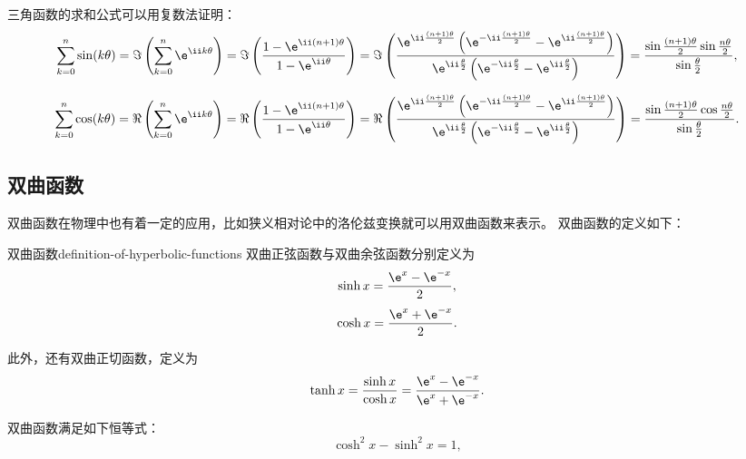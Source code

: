 三角函数的求和公式可以用复数法证明：
\begin{equation}
    \sum_{k=0}^{n} \sin (k \theta)
    = \Im \left( \sum_{k=0}^{n} \e^{\ii k \theta} \right) = \Im \left( \frac{1 - \e^{\ii (n+1) \theta}}{1 - \e^{\ii \theta}} \right)
    = \Im \left( \frac{\e^{\ii \frac{(n+1) \theta}{2}} \left( \e^{-\ii \frac{(n+1) \theta}{2}} - \e^{\ii \frac{(n+1) \theta}{2}} \right)}{\e^{\ii \frac{\theta}{2}} \left( \e^{-\ii \frac{\theta}{2}} - \e^{\ii \frac{\theta}{2}} \right)}\right)
    = \frac{\sin \frac{(n+1) \theta}{2} \sin \frac{n \theta}{2}}{\sin \frac{\theta}{2}} ,
\end{equation}

\begin{equation}
    \sum_{k=0}^{n} \cos (k \theta)
    = \Re \left( \sum_{k=0}^{n} \e^{\ii k \theta} \right) = \Re \left( \frac{1 - \e^{\ii (n+1) \theta}}{1 - \e^{\ii \theta}} \right)
    = \Re \left( \frac{\e^{\ii \frac{(n+1) \theta}{2}} \left( \e^{-\ii \frac{(n+1) \theta}{2}} - \e^{\ii \frac{(n+1) \theta}{2}} \right)}{\e^{\ii \frac{\theta}{2}} \left( \e^{-\ii \frac{\theta}{2}} - \e^{\ii \frac{\theta}{2}} \right)}\right)
    = \frac{\sin \frac{(n+1) \theta}{2} \cos \frac{n \theta}{2}}{\sin \frac{\theta}{2}} .
\end{equation}

\subsection{双曲函数}\label{subsec:hyperbolic-functions}
双曲函数在物理中也有着一定的应用，比如狭义相对论中的洛伦兹变换就可以用双曲函数来表示。
双曲函数的定义如下：
\begin{definition}{双曲函数}{definition-of-hyperbolic-functions}
    双曲正弦函数与双曲余弦函数分别定义为
    \begin{equation}
        \sinh x = \frac{\e^x - \e^{-x}}{2} ,
    \end{equation}
    \begin{equation}
        \cosh x = \frac{\e^x + \e^{-x}}{2} .
    \end{equation}

    此外，还有双曲正切函数，定义为
    \begin{equation}
        \tanh x = \frac{\sinh x}{\cosh x} = \frac{\e^x - \e^{-x}}{\e^x + \e^{-x}} .
    \end{equation}

\end{definition}

双曲函数满足如下恒等式：
\begin{equation}
    \cosh^2 x - \sinh^2 x = 1 ,
\end{equation}

